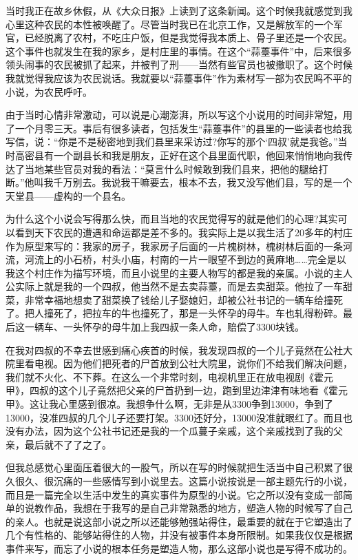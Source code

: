 \documentclass[12pt,a5paper]{ctexbook}
\begin{document}
当时我正在故乡休假，从《大众日报》上读到了这条新闻。这个时候我就感觉到我心里这种农民的本性被唤醒了。尽管当时我已在北京工作，又是解放军的一个军官，已经脱离了农村，不吃庄户饭，但是我觉得我本质上、骨子里还是一个农民。这个事件也就发生在我的家乡，是村庄里的事情。在这个“蒜薹事件”中，后来很多领头闹事的农民被抓了起来，并被判了刑——当然有些官员也被撤职了。这个时候我就觉得我应该为农民说话。我就要以“蒜薹事件”作为素材写一部为农民鸣不平的小说，为农民呼吁。

由于当时心情非常激动，可以说是心潮澎湃，所以写这个小说用的时间非常短，用了一个月零三天。事后有很多读者，包括发生“蒜薹事件”的县里的一些读者也给我写信，说：“你是不是秘密地到我们县里来采访过?你写的那个‘四叔’就是我爸。”当时高密县有一个副县长和我是朋友，正好在这个县里面代职，他回来悄悄地向我传达了当地某些官员对我的看法：“莫言什么时候敢到我们县来，把他的腿给打断。”他叫我千万别去。我说我干嘛要去，根本不去，我又没写他们县，写的是一个天堂县——虚构的一个县名。

为什么这个小说会写得那么快，而且当地的农民觉得写的就是他们的心理?其实可以看到天下农民的遭遇和命运都是差不多的。我实际上是以我生活了20多年的村庄作为原型来写的：我家的房子，我家房子后面的一片槐树林，槐树林后面的一条河流，河流上的小石桥，村头小庙，村南的一片一眼望不到边的黄麻地……完全是以我这个村庄作为描写环境，而且小说里的主要人物写的都是我的亲属。小说的主人公实际上就是我的一个四叔，他当然不是去卖蒜薹，而是去卖甜菜。他拉了一车甜菜，非常幸福地想卖了甜菜换了钱给儿子娶媳妇，却被公社书记的一辆车给撞死了。把人撞死了，把拉车的牛也撞死了，那是一头怀孕的母牛。车也轧得粉碎。最后这一辆车、一头怀孕的母牛加上我四叔一条人命，赔偿了3300块钱。

在我对四叔的不幸去世感到痛心疾首的时候，我发现四叔的一个儿子竟然在公社大院里看电视。因为他们把死者的尸首放到公社大院里，说你们不给我们解决问题，我们就不火化、不下葬。在这么一个非常时刻，电视机里正在放电视剧《霍元甲》，四叔的这个儿子竟然把父亲的尸首扔到一边，跑到里边津津有味地看《霍元甲》。这让我心里感到很凉。我想争什么啊，无非是从3300争到13000，争到了13000，没准四叔的几个儿子还要打架。3300还好分，13000没准就眼红了。而且也没有办法，因为这个公社书记还是我的一个瓜蔓子亲戚，这个亲戚找到了我的父亲，最后就不了了之了。

但我总感觉心里面压着很大的一股气，所以在写的时候就把生活当中自己积累了很久很久、很沉痛的一些感情写到小说里去。这篇小说按说是一部主题先行的小说，而且是一篇完全以生活中发生的真实事件为原型的小说。它之所以没有变成一部简单的说教作品，我想在于我写的是自己非常熟悉的地方，塑造人物的时候写了自己的亲人。也就是说这部小说之所以还能够勉强站得住，最重要的就在于它塑造出了几个有性格的、能够站得住的人物，并没有被事件本身所限制。如果我仅仅是根据事件来写，而忘了小说的根本任务是塑造人物，那么这部小说也是写得不成功的。
\end{document}
